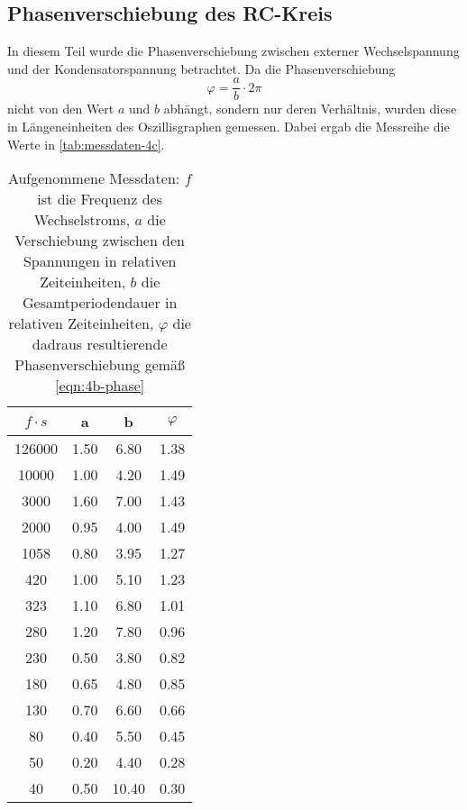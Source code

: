 \subsection{Phasenverschiebung des RC-Kreis}
\label{sec:4c-auswertung}

In diesem Teil wurde die Phasenverschiebung zwischen externer Wechselspannung und der 
Kondensatorspannung betrachtet. Da die Phasenverschiebung
\begin{equation}
	\varphi = \frac{a}{b} \cdot 2\pi
	\label{eqn:4b-phase}
\end{equation}
nicht von den Wert $a$ und $b$ abhängt, sondern nur deren Verhältnis, wurden diese
in Längeneinheiten des Oszillisgraphen gemessen. Dabei ergab die Messreihe die Werte in 
\autoref{tab:messdaten-4c}.

\begin{table}
	\centering
	\caption{Aufgenommene Messdaten: $f$ ist die Frequenz des Wechselstroms, $a$ die 
	Verschiebung zwischen den Spannungen in relativen Zeiteinheiten, $b$ die
	Gesamtperiodendauer in relativen Zeiteinheiten, $\varphi$ die dadraus resultierende
	Phasenverschiebung gemäß \autoref{eqn:4b-phase}}
	\label{tab:messdaten-4c}
	\begin{tabular}{c c c c}
		\toprule
		$f \cdot \si{s}$ &  a & b & $\varphi$ \\
		\midrule
		126000	&  1.50  &	 6.80  &	1.38 \\
		 10000	&  1.00  &	 4.20  &	1.49 \\
		  3000	&  1.60  &	 7.00  &	1.43 \\
		  2000	&  0.95  &	 4.00  &	1.49 \\
		1058  	&  0.80  &	 3.95  &	1.27 \\
		   420	&  1.00  &	 5.10  &	1.23 \\
		   323	&  1.10  &	 6.80  &	1.01 \\
		   280	&  1.20  &	 7.80  &	0.96 \\
		   230	&  0.50  &	 3.80  &	0.82 \\
		   180	&  0.65  &	 4.80  &	0.85 \\
		   130	&  0.70  &	 6.60  &	0.66 \\
		    80	&  0.40  &	 5.50  &	0.45 \\
		    50	&  0.20  &	 4.40  &	0.28 \\
		    40	&  0.50  &	10.40  &	0.30 \\
		\bottomrule
	\end{tabular}
\end{table}

